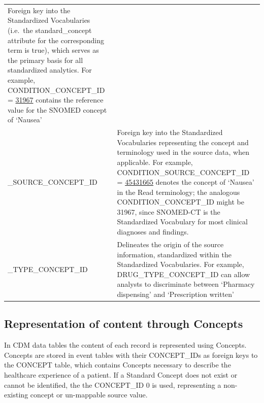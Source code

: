 \documentclass[]{book}
\begin{document}
\begin{longtable}[]{@{}ll@{}}
\begin{minipage}[t]{0.70\columnwidth}
Foreign key into the Standardized Vocabularies (i.e.~the
standard\_concept attribute for the corresponding term is true), which
serves as the primary basis for all standardized analytics. For example,
CONDITION\_CONCEPT\_ID =
\href{http://athena.ohdsi.org/search-terms/terms/31967}{31967} contains
the reference value for the SNOMED concept of `Nausea'\strut
\end{minipage}\tabularnewline
\begin{minipage}[t]{0.24\columnwidth}\raggedright\strut
\_SOURCE\_CONCEPT\_ID\strut
\end{minipage} & \begin{minipage}[t]{0.70\columnwidth}\raggedright\strut
Foreign key into the Standardized Vocabularies representing the concept
and terminology used in the source data, when applicable. For example,
CONDITION\_SOURCE\_CONCEPT\_ID =
\href{http://athena.ohdsi.org/search-terms/terms/45431665}{45431665}
denotes the concept of `Nausea' in the Read terminology; the analogous
CONDITION\_CONCEPT\_ID might be 31967, since SNOMED-CT is the
Standardized Vocabulary for most clinical diagnoses and findings.\strut
\end{minipage}\tabularnewline
\begin{minipage}[t]{0.24\columnwidth}\raggedright\strut
\_TYPE\_CONCEPT\_ID\strut
\end{minipage} & \begin{minipage}[t]{0.70\columnwidth}\raggedright\strut
Delineates the origin of the source information, standardized within the
Standardized Vocabularies. For example, DRUG\_TYPE\_CONCEPT\_ID can
allow analysts to discriminate between `Pharmacy dispensing' and
`Prescription written'\strut
\end{minipage}\tabularnewline
\bottomrule
\end{longtable}

\subsection{Representation of content through
Concepts}\label{representation-of-content-through-concepts}

In CDM data tables the content of each record is represented using
Concepts. Concepts are stored in event tables with their CONCEPT\_IDs as
foreign keys to the CONCEPT table, which contains Concepts necessary to
describe the healthcare experience of a patient. If a Standard Concept
does not exist or cannot be identified, the the CONCEPT\_ID 0 is used,
representing a non-existing concept or un-mappable source value.
\end{document}
